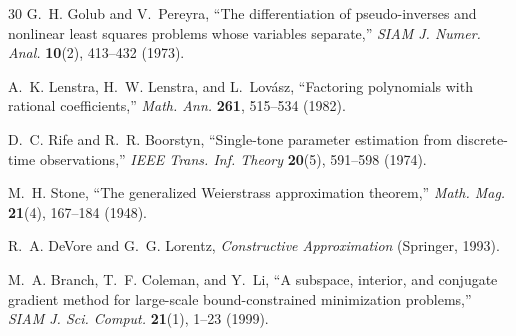 \documentclass[twocolumn,preprintnumbers,amsmath,amssymb,pra,floatfix]{revtex4-2}
\begin{document}
\begin{thebibliography}{30}
G.~H. Golub and V.~Pereyra, ``The differentiation of pseudo-inverses
and nonlinear least squares problems whose variables separate,''
\emph{SIAM J. Numer. Anal.} \textbf{10}(2), 413--432 (1973).

A.~K. Lenstra, H.~W. Lenstra, and L.~Lov\'asz, ``Factoring polynomials
with rational coefficients,''
\emph{Math. Ann.} \textbf{261}, 515--534 (1982).

D.~C. Rife and R.~R. Boorstyn, ``Single-tone parameter estimation from
discrete-time observations,''
\emph{IEEE Trans. Inf. Theory} \textbf{20}(5), 591--598 (1974).

M.~H. Stone, ``The generalized Weierstrass approximation theorem,''
\emph{Math. Mag.} \textbf{21}(4), 167--184 (1948).

R.~A. DeVore and G.~G. Lorentz, \emph{Constructive Approximation}
(Springer, 1993).

M.~A. Branch, T.~F. Coleman, and Y.~Li, ``A subspace, interior, and
conjugate gradient method for large-scale bound-constrained
minimization problems,''
\emph{SIAM J. Sci. Comput.} \textbf{21}(1), 1--23 (1999).

\end{thebibliography}
\end{document}
